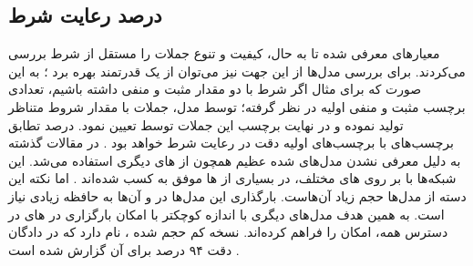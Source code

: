 \subsection{درصد رعایت شرط}
معیارهای معرفی شده تا به حال، کیفیت و تنوع جملات را مستقل از شرط بررسی می‌کردند. برای بررسی مدل‌ها از این جهت نیز می‌توان از یک \classifier{} قدرتمند بهره برد
\cite{toward, sentigan}؛
به این صورت که برای مثال اگر شرط با دو مقدار مثبت و منفی داشته باشیم، تعدادی برچسب مثبت و منفی اولیه در نظر گرفته؛ توسط مدل، جملات با مقدار شروط متناظر تولید نموده و در نهایت برچسب این جملات توسط \classifier{} تعیین نمود. درصد تطابق برچسب‌های \classifier{} با برچسب‌های اولیه دقت در رعایت شرط خواهد بود
\cite{toward, sentigan}.
در مقالات گذشته به دلیل معرفی نشدن مدل‌های \pretrain{} شده عظیم همچون  از \classifier{}های دیگری استفاده می‌شد. این شبکه‌ها با
بر روی \task{}‌های مختلف، در بسیاری از \task{}ها موفق به کسب \stateoftheart{} شده‌اند \cite{bert}. اما نکته این دسته از مدل‌ها حجم زیاد آن‌هاست. بارگذاری  این مدل‌ها در \gpu{} و \finetuning{} آن‌ها به حافظه زیادی نیاز است. به همین هدف مدل‌های دیگری با اندازه کوچکتر با امکان بارگزاری در \gpu{}‌های در دسترس همه، امکان \finetuning{} را فراهم کرده‌اند. نسخه کم حجم شده ،
نام دارد که در دادگان  دقت ۹۴ درصد برای آن گزارش شده است \cite{distilbert}.

